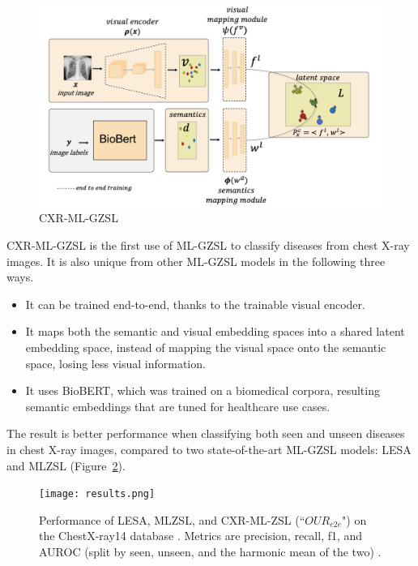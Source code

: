 \documentclass[letterpaper]{article} %
\begin{document}
\begin{figure}[h!]
\centering
\includegraphics[width=0.9\columnwidth]{model.png}
\caption{CXR-ML-GZSL \cite{hayat2021multilabel}}
\label{fig:model}
\end{figure}

CXR-ML-GZSL is the first use of ML-GZSL to classify diseases from chest X-ray images. It is also unique from other ML-GZSL models in the following three ways.

\begin{itemize}
    \item It can be trained end-to-end, thanks to the trainable visual encoder.
    \item It maps both the semantic and visual embedding spaces into a shared latent embedding space, instead of mapping the visual space onto the semantic space, losing less visual information.
    \item It uses BioBERT, which was trained on a biomedical corpora, resulting semantic embeddings that are tuned for healthcare use cases.
\end{itemize}

The result is better performance when classifying both seen and unseen diseases in chest X-ray images, compared to two state-of-the-art ML-GZSL models: LESA \cite{9157745} and MLZSL \cite{lee2018multilabelzeroshotlearningstructured} (Figure~\ref{fig:results}).

\begin{figure}[h!]
\centering
\texttt{[image: results.png]}
\caption{Performance of LESA, MLZSL, and CXR-ML-ZSL (``$OUR_{e2e}$") on the ChestX-ray14 database \cite{Wang_2017}. Metrics are precision, recall, f1, and AUROC (split by seen, unseen, and the harmonic mean of the two) \cite{hayat2021multilabel}.}
\label{fig:results}
\end{figure}
\end{document}
